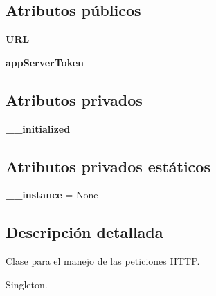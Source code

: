 \subsection*{Atributos públicos}
\begin{DoxyCompactItemize}
\item 
\hypertarget{classsrc_1_1models_1_1conectividad_1_1_conectividad_a6ed04b1a19ff1611f8b669fcb64c155e}{{\bfseries U\-R\-L}}\label{classsrc_1_1models_1_1conectividad_1_1_conectividad_a6ed04b1a19ff1611f8b669fcb64c155e}

\item 
\hypertarget{classsrc_1_1models_1_1conectividad_1_1_conectividad_a87a6424e6c79858c600bf775c179f6cb}{{\bfseries app\-Server\-Token}}\label{classsrc_1_1models_1_1conectividad_1_1_conectividad_a87a6424e6c79858c600bf775c179f6cb}

\end{DoxyCompactItemize}
\subsection*{Atributos privados}
\begin{DoxyCompactItemize}
\item 
\hypertarget{classsrc_1_1models_1_1conectividad_1_1_conectividad_aaa0fd93a0bcb36b6919cc8facfb206ae}{{\bfseries \-\_\-\-\_\-initialized}}\label{classsrc_1_1models_1_1conectividad_1_1_conectividad_aaa0fd93a0bcb36b6919cc8facfb206ae}

\end{DoxyCompactItemize}
\subsection*{Atributos privados estáticos}
\begin{DoxyCompactItemize}
\item 
\hypertarget{classsrc_1_1models_1_1conectividad_1_1_conectividad_afc871ada2c0ad70cf6091a8bce0e30c1}{{\bfseries \-\_\-\-\_\-instance} = None}\label{classsrc_1_1models_1_1conectividad_1_1_conectividad_afc871ada2c0ad70cf6091a8bce0e30c1}

\end{DoxyCompactItemize}


\subsection{Descripción detallada}
Clase para el manejo de las peticiones H\-T\-T\-P. 

Singleton. 

